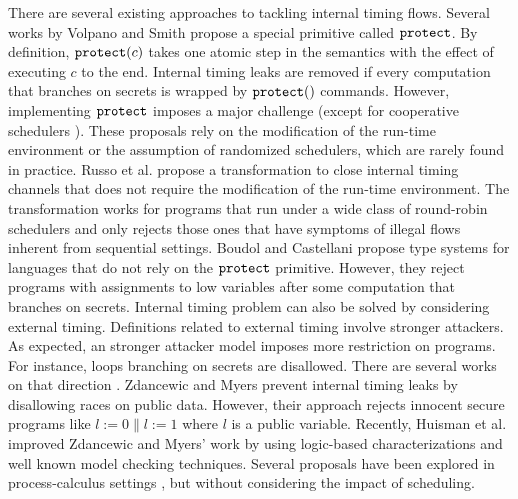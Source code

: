 \documentclass[times, 10pt,twocolumn]{article}
\begin{document}
{%
There are several existing approaches to tackling internal timing
flows. Several works by Volpano and Smith 
\cite{Smith:Volpano:MultiThreaded,Volpano:Smith:Probabilistic,Smith:CSFW01,Smith:CSFW03} 
propose a special primitive called $\mathtt{protect}$. 
By definition, $\mathtt{protect}(c)$ takes 
one atomic step in the semantics with the effect of executing $c$ to
the end. Internal timing leaks are removed 
if every computation that branches on secrets is wrapped by 
$\mathtt{protect}()$ commands. However, implementing $\mathtt{protect}$
imposes a major challenge 
\cite{Sabelfeld:Sands:CSFW00,Sabelfeld:PSI01,Russo:Sabelfeld:CSFW06} 
(except for cooperative schedulers \cite{Russo:Sabelfeld:PSI06}). 
These proposals rely on the modification of the run-time environment
or the assumption of randomized schedulers, which are rarely found in practice.   
Russo et al.  
\cite{Russo:Hughes:Naumann:Sabelfeld:ASIAN06}
propose a transformation to
close internal timing channels that does not require the modification
of the run-time environment. The
transformation works for programs that run under a wide class of
round-robin schedulers and only rejects those ones that have symptoms of illegal
flows inherent from sequential settings.
%
Boudol and Castellani 
\cite{Castellani:Boudol:ICALP01,Castellani:Boudol:TCS02} propose type
systems for languages that do not rely on the $\mathtt{protect}$
primitive. However, they reject programs with assignments to low
variables after some computation that branches on secrets.
%
Internal timing problem can also be solved by considering external
timing. Definitions related to external timing involve stronger
attackers. As expected, an stronger attacker model imposes more
restriction on programs. For instance, loops branching on secrets are 
disallowed. There are several works on that direction 
\cite{Agat:timing, Sabelfeld:Sands:CSFW00, Sabelfeld:PSI01, 
  Sabelfeld:Mantel:SAS02, Kopf:Mantel:FAST05}.
%
Zdancewic and Myers \cite{Zdancewic:Myers:CSFW03} prevent internal timing leaks by
disallowing races on public data. However, their approach
rejects innocent secure programs like $l:=0 \parallel l:=1$ where $l$
is a public variable.
Recently, Huisman et al. \cite{Huisman:Worah:Sunesen:CSFW06} improved
Zdancewic and Myers' work by using logic-based characterizations and
well known model checking techniques.
%
Several proposals have been explored in process-calculus settings 
\cite{Honda+:ESOP00,Focardi:Gorrieri:FOSAD01,Ryan:Bertinoro01,Honda:Yoshida:POPL02,
Pottier:CSFW02}, but without considering the impact of
scheduling. 

}
\end{document}
